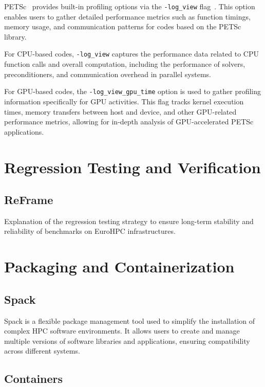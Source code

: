 PETSc~\cite{balay_petsc_2024} provides built-in profiling options via the \texttt{-log\_view} flag~\cite{balay_petsctao_2024}. 
This option enables users to gather detailed performance metrics such as function timings, memory usage, and communication patterns for codes based on the PETSc library. 

For CPU-based codes, \texttt{-log\_view} captures the performance data related to CPU function calls and overall computation, including the performance of solvers, preconditioners, and communication overhead in parallel systems.

For GPU-based codes, the \texttt{-log\_view\_gpu\_time} option is used to gather profiling information specifically for GPU activities. 
This flag tracks kernel execution times, memory transfers between host and device, and other GPU-related performance metrics, allowing for in-depth analysis of GPU-accelerated PETSc applications.




\section{Regression Testing and Verification}
\label{sec:methodology-regression}

\subsection{ReFrame}
\label{sec:methodology-regression-reframe}

Explanation of the regression testing strategy to ensure long-term stability and reliability of benchmarks on EuroHPC infrastructures.

\section{Packaging and Containerization}
\label{sec:methodology-packaging}

\subsection{Spack}
\label{sec:methodology-packaging-spack}

Spack is a flexible package management tool used to simplify the installation of complex HPC software environments. It allows users to create and manage multiple versions of software libraries and applications, ensuring compatibility across different systems.

\subsection{Containers}
\label{sec:methodology-packaging-container}

